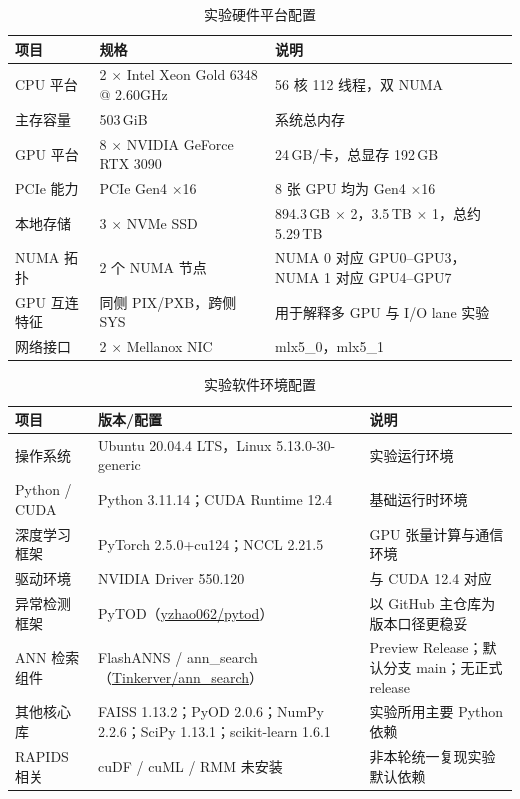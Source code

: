 \begin{table}[htbp]
  \caption{实验硬件平台配置}
  \label{tab:hw-config}
  \centering
  \small
  \renewcommand{\arraystretch}{1.15}
  \begin{adjustbox}{max width=\linewidth}
  \begin{tabular}{P{2.3cm}P{5.8cm}P{6.2cm}}
    \toprule
    项目 & 规格 & 说明 \\
    \midrule
    CPU 平台 & 2 $\times$ Intel Xeon Gold 6348 @ 2.60GHz & 56 核 112 线程，双 NUMA \\
    主存容量 & 503\,GiB & 系统总内存 \\
    GPU 平台 & 8 $\times$ NVIDIA GeForce RTX 3090 & 24\,GB/卡，总显存 192\,GB \\
    PCIe 能力 & PCIe Gen4 $\times$16 & 8 张 GPU 均为 Gen4 $\times$16 \\
    本地存储 & 3 $\times$ NVMe SSD & 894.3\,GB $\times$ 2，3.5\,TB $\times$ 1，总约 5.29\,TB \\
    NUMA 拓扑 & 2 个 NUMA 节点 & NUMA 0 对应 GPU0--GPU3，NUMA 1 对应 GPU4--GPU7 \\
    GPU 互连特征 & 同侧 PIX/PXB，跨侧 SYS & 用于解释多 GPU 与 I/O lane 实验 \\
    网络接口 & 2 $\times$ Mellanox NIC & mlx5\_0，mlx5\_1 \\
    \bottomrule
  \end{tabular}
  \end{adjustbox}
\end{table}

\begin{table}[htbp]
  \caption{实验软件环境配置}
  \label{tab:sw-config}
  \centering
  \small
  \renewcommand{\arraystretch}{1.15}
  \begin{adjustbox}{max width=\linewidth}
  \begin{tabular}{P{2.6cm}P{6.2cm}P{5.5cm}}
    \toprule
    项目 & 版本/配置 & 说明 \\
    \midrule
    操作系统 & Ubuntu 20.04.4 LTS，Linux 5.13.0-30-generic & 实验运行环境 \\
    Python / CUDA & Python 3.11.14；CUDA Runtime 12.4 & 基础运行时环境 \\
    深度学习框架 & PyTorch 2.5.0+cu124；NCCL 2.21.5 & GPU 张量计算与通信环境 \\
    驱动环境 & NVIDIA Driver 550.120 & 与 CUDA 12.4 对应 \\
    异常检测框架 & PyTOD（\href{https://github.com/yzhao062/pytod}{yzhao062/pytod}） & 以 GitHub 主仓库为版本口径更稳妥 \\
    ANN 检索组件 & FlashANNS / ann\_search（\href{https://github.com/Tinkerver/ann_search}{Tinkerver/ann\_search}） & Preview Release；默认分支 main；无正式 release \\
    其他核心库 & FAISS 1.13.2；PyOD 2.0.6；NumPy 2.2.6；SciPy 1.13.1；scikit-learn 1.6.1 & 实验所用主要 Python 依赖 \\
    RAPIDS 相关 & cuDF / cuML / RMM 未安装 & 非本轮统一复现实验默认依赖 \\
    \bottomrule
  \end{tabular}
  \end{adjustbox}
\end{table}

